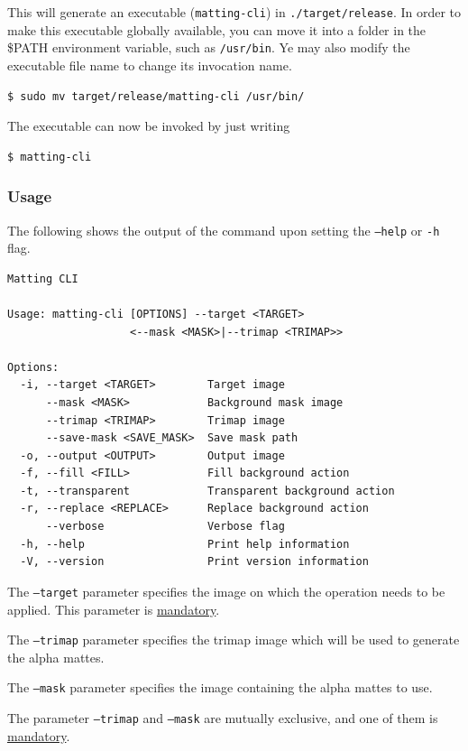\documentclass[a4paper]{article}
\begin{document}
This will generate an executable (\texttt{matting-cli})
in \texttt{./target/release}.
In order to make this executable globally available,
you can move it into a folder in the \textsc{\$PATH} environment
variable, such as \texttt{/usr/bin}.
Ye may also modify the executable file name to change its invocation
name.

\begin{lstlisting}[style=boxed]
    $ sudo mv target/release/matting-cli /usr/bin/
\end{lstlisting}

The executable can now be invoked by just writing
\begin{lstlisting}[style=boxed]
    $ matting-cli
\end{lstlisting}

\subsubsection{Usage}

The following shows the output of the command upon
setting the \texttt{--help} or \texttt{-h} flag.
\begin{lstlisting}[style=boxed]
Matting CLI

Usage: matting-cli [OPTIONS] --target <TARGET>
                   <--mask <MASK>|--trimap <TRIMAP>>

Options:
  -i, --target <TARGET>        Target image
      --mask <MASK>            Background mask image
      --trimap <TRIMAP>        Trimap image
      --save-mask <SAVE_MASK>  Save mask path
  -o, --output <OUTPUT>        Output image
  -f, --fill <FILL>            Fill background action
  -t, --transparent            Transparent background action
  -r, --replace <REPLACE>      Replace background action
      --verbose                Verbose flag
  -h, --help                   Print help information
  -V, --version                Print version information
\end{lstlisting}

The \texttt{--target} parameter specifies the image
on which the operation needs to be applied.
This parameter is \underline{mandatory}.

The \texttt{--trimap} parameter specifies the \gls{trimap}
image which will be used to generate the alpha \gls{matte}s.

The \texttt{--mask} parameter specifies the image
containing the alpha mattes to use.

The parameter \texttt{--trimap} and \texttt{--mask}
are mutually exclusive, and one of them is \underline{mandatory}.
\end{document}
